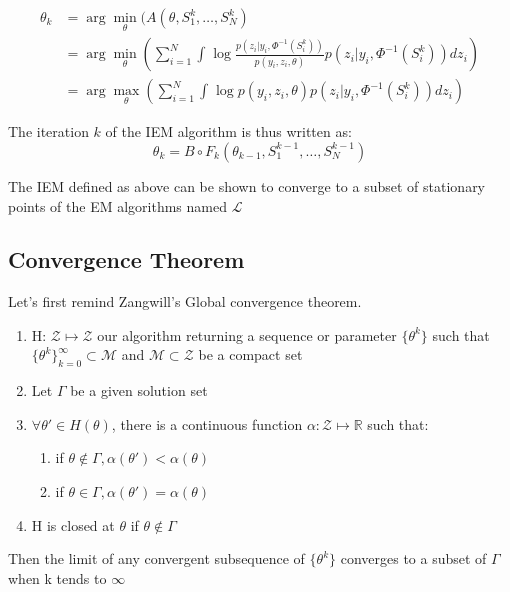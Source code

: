 \documentclass{article}
\theoremstyle{plain}
\theoremstyle{plain}
\theoremstyle{definition}
\begin{document}
\begin{equation}
\begin{split}
\theta_{k} & = \arg \min\limits_{\theta}(A(\theta,S_1^k,\dots,S_N^k) \\
& = \arg \min\limits_{\theta}(\sum_{i=1}^{N}{\int_{}{\log\frac{p(z_i|y_i, \Phi^{-1}(S_i^k))}{p(y_i,z_i, \theta)}p(z_i|y_i, \Phi^{-1}(S_i^k)) dz_i}})\\
& = \arg \max\limits_{\theta}(\sum_{i=1}^{N}{\int_{}{\log p(y_i,z_i,\theta)p(z_i|y_i, \Phi^{-1}(S_i^k)) dz_i}})
\end{split}
\end{equation}

\noindent The iteration $k$ of the IEM algorithm is thus written as:
\begin{equation}
\theta_{k}=B \circ F_{k}(\theta_{k-1}, S_1^{k-1}, \dots, S_N^{k-1})
\end{equation}


The IEM defined as above can be shown to converge to a subset of stationary points of the EM algorithms named $\mathcal{L}$\\

\subsection{Convergence Theorem}
Let's first remind Zangwill's Global convergence theorem.

\begin{enumerate}
    \item H: $\mathcal{Z} \mapsto \mathcal{Z}$ our algorithm returning a sequence or parameter $\{\theta^k\}$ such that $\{\theta^k\}_{k=0}^{\infty} \subset \mathcal{M}$ and $\mathcal{M} \subset \mathcal{Z}$ be a compact set
    \item Let $\Gamma$ be a given solution set
    \item $\forall \theta' \in H(\theta)$, there is a continuous function $\alpha: \mathcal{Z} \mapsto \mathbb{R}$ such that:
    \begin{enumerate}
      \item if $\theta \notin \Gamma, \alpha(\theta') < \alpha(\theta)$
      \item if $\theta \in \Gamma, \alpha(\theta') = \alpha(\theta)$
    \end{enumerate}
    \item H is closed at $\theta$ if $\theta \notin \Gamma$
\end{enumerate}
Then the limit of any convergent subsequence of $\{\theta^k\}$ converges to a subset of $\Gamma$ when k tends to $\infty$\\
\end{document}
